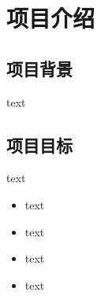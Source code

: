 
\section{项目介绍}

\subsection{项目背景}
text

\subsection{项目目标}
text
\begin{itemize}
    \item text
    \item text
    \item text
    \item text
\end{itemize}

